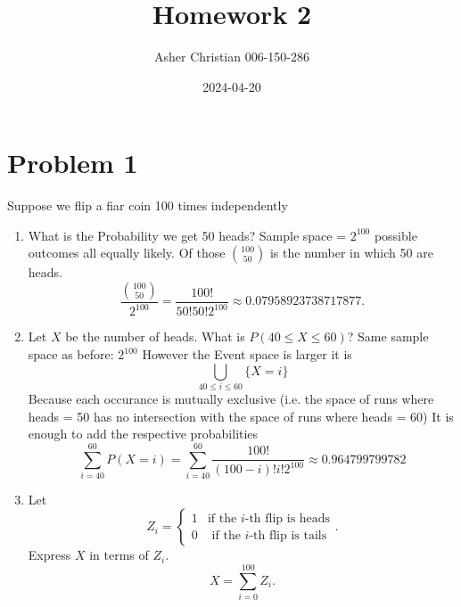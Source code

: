 \documentclass{article}
\title{Homework 2}
\author{Asher Christian 006-150-286}
\date{2024-04-20}
\begin{document}
    \maketitle
    \section{Problem 1}
    Suppose we flip a fiar coin 100 times independently
    \begin{enumerate}
        \item What is the Probability we get 50 heads?
            Sample space = $2^{100}$ possible outcomes all equally likely.
            Of those  $\binom{100}{50}$ is the number in which 50 are heads.
            \[
                \frac{\binom{100}{50}}{2^{100}} = \frac{100!}{50!50!2^{100}} \approx 0.07958923738717877
            .\] 
        \item Let $X$ be the number of heads. What is $P(40 \le X \le 60)$?
            Same sample space as before:  $2^{100}$ However the Event space is larger
            it is
            \[
                \bigcup\limits_{40 \le i \le 60} \{X = i \}
            \] 
            Because each occurance is mutually exclusive (i.e. the space of runs where 
            heads = 50 has no intersection with the space of runs where heads = 60)
            It is enough to add the respective probabilities
            \[
                \sum_{i=40}^{60} P(X=i) = \sum_{i=40}^{60} \frac{100!}{(100-i)!i!2^{100}} \approx 0.964799799782
            \] 
        \item Let \[
        Z_i =
        \begin{cases}
            1 & \text{if the $i$-th flip is heads} \\
            0 & \text{ if the $i$-th flip is tails}
        \end{cases}
        .\]    
        Express $X$ in terms of $Z_i$.
        \[
            X = \sum_{i=0}^{100} Z_i
        .\] 
    \end{enumerate}
\end{document}

